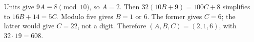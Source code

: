 Units give $9A\equiv8\pmod{10}$, so $A=2$. Then $32(10B+9)=100C+8$ simplifies to $16B+14=5C$. Modulo five gives $B=1$ or 6. The former gives $C=6$; the latter would give $C=22$, not a digit. Therefore $\boxed{(A,B,C)=(2,1,6)}$, with $32\cdot19=608$.
